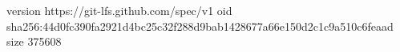 version https://git-lfs.github.com/spec/v1
oid sha256:44d0fc390fa2921d4bc25c32f288d9bab1428677a66e150d2c1c9a510c6feaad
size 375608
